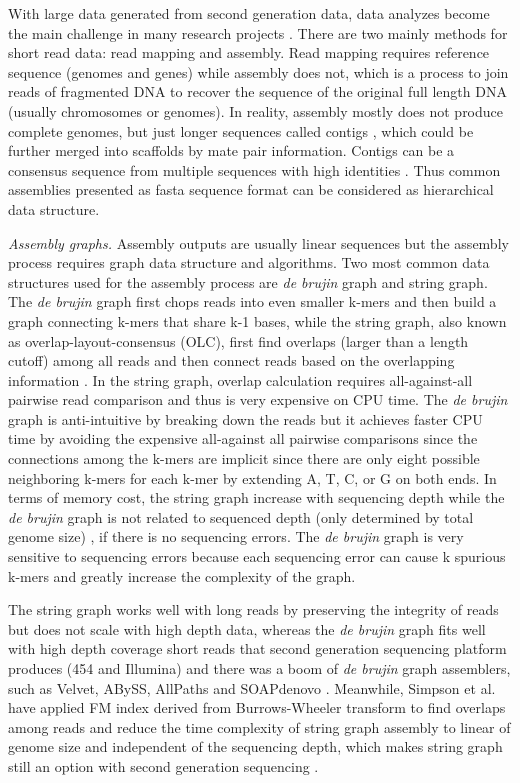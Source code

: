 \documentclass[]{msu-thesis}
\begin{document}
With large data generated from second generation data, data analyzes
become the main challenge in many research projects
\cite{qin_human_2010,pell_scaling_2012}. There are two mainly methods
for short read data: read mapping and assembly. Read mapping requires
reference sequence (genomes and genes) while assembly does not, which
is a process to join reads of fragmented DNA to recover the sequence
of the original full length DNA (usually chromosomes or genomes). In
reality, assembly mostly does not produce complete genomes, but just
longer sequences called contigs
\cite{qin_human_2010,howe_tackling_2014}, which could be further
merged into scaffolds by mate pair information. Contigs can be a
consensus sequence from multiple sequences with high identities
\cite{zerbino_velvet:_2008}. Thus common assemblies presented as fasta
sequence format can be considered as hierarchical data structure.

\textit{Assembly graphs. } Assembly outputs are usually linear
sequences but the assembly process requires graph data structure and
algorithms. Two most common data structures used for the assembly
process are \textit{de brujin} graph and string graph.  The \textit{de
  brujin} graph first chops reads into even smaller k-mers and then
build a graph connecting k-mers that share k-1 bases, while the string
graph, also known as overlap-layout-consensus (OLC), first find
overlaps (larger than a length cutoff) among all reads and then
connect reads based on the overlapping information
\cite{zerbino_velvet:_2008,simpson_efficient_2012}. In the string
graph, overlap calculation requires all-against-all pairwise read
comparison and thus is very expensive on CPU time. The \textit{de
  brujin} graph is anti-intuitive by breaking down the reads but it
achieves faster CPU time by avoiding the expensive all-against all
pairwise comparisons since the connections among the k-mers are
implicit since there are only eight possible neighboring k-mers for
each k-mer by extending A, T, C, or G on both ends. In terms of memory
cost, the string graph increase with sequencing depth while the
\textit{de brujin} graph is not related to sequenced depth (only
determined by total genome size) \cite{li_comparison_2012}, if there
is no sequencing errors. The \textit{de brujin} graph is very
sensitive to sequencing errors because each sequencing error can cause
k spurious k-mers and greatly increase the complexity of the graph.

The string graph works well with long reads by preserving the
integrity of reads but does not scale with high depth data, whereas
the \textit{de brujin} graph fits well with high depth coverage short
reads that second generation sequencing platform produces (454 and
Illumina) and there was a boom of \textit{de brujin} graph assemblers,
such as Velvet, ABySS, AllPaths and SOAPdenovo
\cite{zerbino_velvet:_2008,simpson_abyss:_2009,butler_allpaths:_2008,luo_soapdenovo2:_2012}. Meanwhile,
Simpson et al. have applied FM index derived from Burrows-Wheeler
transform to find overlaps among reads and reduce the time complexity
of string graph assembly to linear of genome size and independent of
the sequencing depth, which makes string graph still an option with
second generation sequencing \cite{simpson_efficient_2012}.
\end{document}
